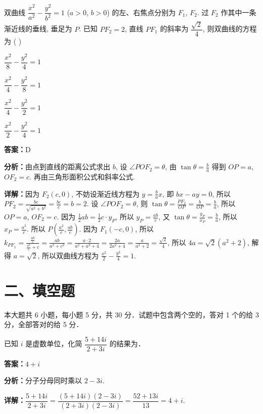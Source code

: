 \begin{question}[points=5]
双曲线 $\dfrac{x^2}{a^2} - \dfrac{y^2}{b^2} = 1$ ($a > 0$, $b > 0$) 的左、右焦点分别为 $F_1$, $F_2$. 过 $F_2$ 作其中一条渐近线的垂线, 垂足为 $P$. 已知 $PF_2 = 2$, 直线 $PF_1$ 的斜率为 $\dfrac{\sqrt{2}}{4}$, 则双曲线的方程为 ( )
\begin{choices}
  \item $\dfrac{x^2}{8} - \dfrac{y^2}{4} = 1$
  \item $\dfrac{x^2}{4} - \dfrac{y^2}{8} = 1$
  \item $\dfrac{x^2}{4} - \dfrac{y^2}{2} = 1$
  \item $\dfrac{x^2}{2} - \dfrac{y^2}{4} = 1$
\end{choices}
\begin{solution}
\textbf{答案：}D

\textbf{分析：}由点到直线的距离公式求出 $b$, 设 $\angle POF_2 = \theta$, 由 $\tan \theta = \frac{b}{a}$ 得到 $OP = a$, $OF_2 = c$. 再由三角形面积公式和斜率公式.

\textbf{详解：}因为 $F_2(c,0)$, 不妨设渐近线方程为 $y = \frac{b}{a}x$, 即 $bx - ay = 0$, 所以 $PF_2 = \frac{bc}{\sqrt{a^2 + b^2}} = \frac{bc}{c} = b = 2$. 设 $\angle POF_2 = \theta$, 则 $\tan \theta = \frac{PF_2}{OP} = \frac{b}{OP} = \frac{b}{a}$, 所以 $OP = a$, $OF_2 = c$. 因为 $\frac{1}{2}ab = \frac{1}{2}c \cdot y_P$, 所以 $y_P = \frac{ab}{c}$, 又 $\tan \theta = \frac{y_P}{x_P} = \frac{b}{a}$, 所以 $x_P = \frac{a^2}{c}$. 所以 $P\left(\frac{a^2}{c}, \frac{ab}{c}\right)$. 因为 $F_1(-c,0)$, 所以 $k_{PF_1} = \frac{\frac{ab}{c}}{\frac{a^2}{c} + c} = \frac{ab}{a^2 + c^2} = \frac{a \cdot 2}{a^2 + a^2 + 4} = \frac{2a}{2a^2 + 4} = \frac{a}{a^2 + 2} = \frac{\sqrt{2}}{4}$, 所以 $4a = \sqrt{2}(a^2 + 2)$, 解得 $a = \sqrt{2}$, 所以双曲线方程为 $\frac{x^2}{2} - \frac{y^2}{4} = 1$.
\end{solution}
\end{question}

\section*{二、填空题}
本大题共 6 小题，每小题 5 分，共 30 分．试题中包含两个空的，答对 1 个的给 3 分，全部答对的给 5 分．

\begin{question}[points=5]
已知 $i$ 是虚数单位，化简 $\dfrac{5 + 14i}{2 + 3i}$ 的结果为．
\fillin[{$4 + i$}]
\begin{solution}
\textbf{答案：}$4 + i$

\textbf{分析：}分子分母同时乘以 $2 - 3i$.

\textbf{详解：}$\dfrac{5 + 14i}{2 + 3i} = \dfrac{(5+14i)(2-3i)}{(2+3i)(2-3i)} = \dfrac{52 + 13i}{13} = 4 + i$.
\end{solution}
\end{question}

